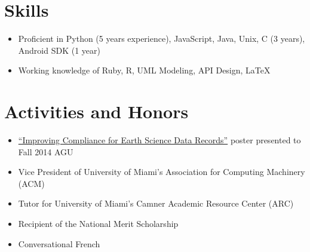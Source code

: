 \documentclass[letterpaper,12pt]{article}
\begin{document}
\vskip 2.5mm


\section*{Skills}
\begin{itemize}
  \item Proficient in Python (5 years experience), JavaScript, Java, Unix, C (3 years), Android SDK (1 year)
  \item Working knowledge of Ruby, R, UML Modeling, API Design, \LaTeX
\end{itemize}

\vskip 2.5mm

\section*{Activities and Honors}
\begin{itemize}
  \item \href{https://oychang.com/research/jpl/compliance-checker-poster.pdf}{``Improving Compliance for Earth Science Data Records''} poster presented to Fall 2014 AGU
  \item Vice President of University of Miami's Association for Computing Machinery (ACM)
  \item Tutor for University of Miami's Camner Academic Resource Center (ARC)
  \item Recipient of the National Merit Scholarship
  \item Conversational French
\end{itemize}
\end{document}
